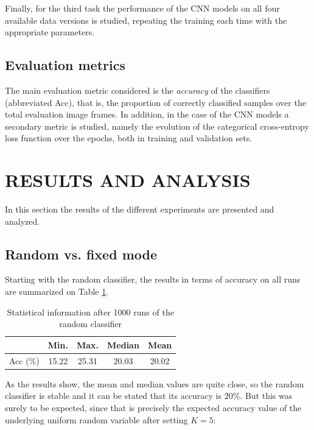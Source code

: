 \documentclass[letterpaper, 10 pt, conference]{IEEEtran}
\begin{document}
Finally, for the third task the performance of the CNN models on all four available data versions is studied, repeating the training each time with the appropriate parameters.

\subsection{Evaluation metrics}

The main evaluation metric considered is the \textit{accuracy} of the classifiers (abbreviated Acc), that is, the proportion of correctly classified samples over the total evaluation image frames. In addition, in the case of the CNN models a secondary metric is studied, namely the evolution of the categorical cross-entropy loss function over the epochs, both in training and validation sets.


\section{RESULTS AND ANALYSIS}

In this section the results of the different experiments are presented and analyzed.

\subsection{Random vs. fixed mode}

Starting with the random classifier, the results in terms of accuracy on all runs are summarized on Table \ref{tab:random}.

\begin{table}[h!]
  \centering
  \begin{tabular}{c|cccc}
    & Min. & Max. & Median & Mean\\
    \hline
    Acc (\%) & 15.22 & 25.31 & 20.03 & 20.02
  \end{tabular}\vspace{1em}
  \caption{Statistical information after 1000 runs of the random classifier}
  \label{tab:random}
\end{table}

As the results show, the mean and median values are quite close, so the random classifier is stable and it can be stated that its accuracy is $20\%$. But this was surely to be expected, since that is precisely the expected accuracy value of the underlying uniform random variable after setting $K=5$:
\end{document}
